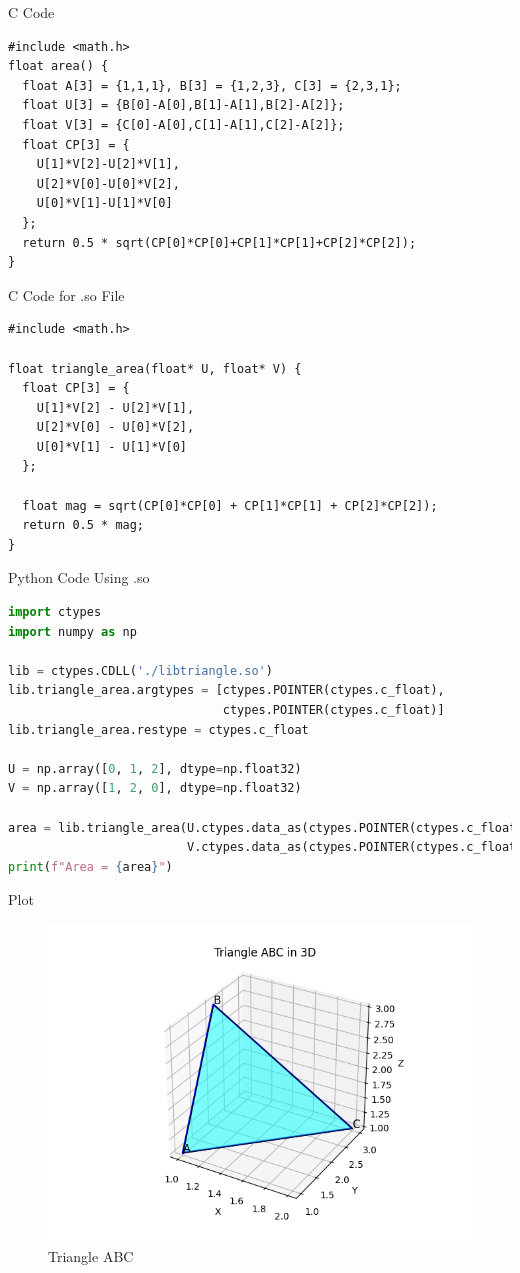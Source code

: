 \documentclass{beamer}
\begin{document}
\begin{frame}[fragile]{C Code}
\begin{lstlisting}
#include <math.h>
float area() {
  float A[3] = {1,1,1}, B[3] = {1,2,3}, C[3] = {2,3,1};
  float U[3] = {B[0]-A[0],B[1]-A[1],B[2]-A[2]};
  float V[3] = {C[0]-A[0],C[1]-A[1],C[2]-A[2]};
  float CP[3] = {
    U[1]*V[2]-U[2]*V[1],
    U[2]*V[0]-U[0]*V[2],
    U[0]*V[1]-U[1]*V[0]
  };
  return 0.5 * sqrt(CP[0]*CP[0]+CP[1]*CP[1]+CP[2]*CP[2]);
}
\end{lstlisting}
\end{frame}


\begin{frame}[fragile]{C Code for .so File }
\begin{lstlisting}
#include <math.h>

float triangle_area(float* U, float* V) {
  float CP[3] = {
    U[1]*V[2] - U[2]*V[1],
    U[2]*V[0] - U[0]*V[2],
    U[0]*V[1] - U[1]*V[0]
  };

  float mag = sqrt(CP[0]*CP[0] + CP[1]*CP[1] + CP[2]*CP[2]);
  return 0.5 * mag;
}
\end{lstlisting}
\end{frame}


\begin{frame}[fragile]{Python Code Using .so }
\begin{lstlisting}[language=Python]
import ctypes
import numpy as np

lib = ctypes.CDLL('./libtriangle.so')
lib.triangle_area.argtypes = [ctypes.POINTER(ctypes.c_float),
                              ctypes.POINTER(ctypes.c_float)]
lib.triangle_area.restype = ctypes.c_float

U = np.array([0, 1, 2], dtype=np.float32)
V = np.array([1, 2, 0], dtype=np.float32)

area = lib.triangle_area(U.ctypes.data_as(ctypes.POINTER(ctypes.c_float)),
                         V.ctypes.data_as(ctypes.POINTER(ctypes.c_float)))
print(f"Area = {area}")
\end{lstlisting}
\end{frame}






\begin{frame}{Plot}
\begin{figure}[H]
    \centering
    \includegraphics[width=0.78\linewidth]{Figs/fig1 (1).png}
    \caption{Triangle ABC}
    \label{fig:fig1}
\end{figure}
\end{frame}
\end{document}
